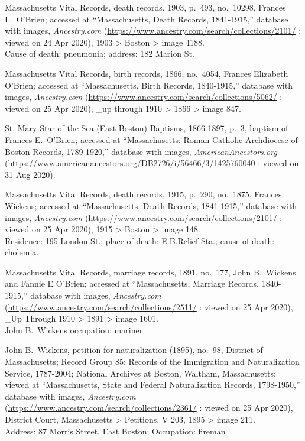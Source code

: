 \begin{thebibliography}{999}
Massachusetts Vital Records, death records, 1903, p.\ 493, no.\ 10298, Frances L.\ O'Brien; accessed at ``Massachusetts, Death Records, 1841-1915,'' database with images, \textit{Ancestry.com} (\url{https://www.ancestry.com/search/collections/2101/} : viewed on 24 Apr 2020), 1903 > Boston > image 4188.\\
Cause of death: pneumonia; address: 182 Marion St.


Massachusetts Vital Records, birth records, 1866, no.\ 4054, Frances Elizabeth O'Brien; accessed at ``Massachusetts, Birth Records, 1840-1915,'' database with images, \textit{Ancestry.com} (\url{https://www.ancestry.com/search/collections/5062/} : viewed on 25 Apr 2020), \_up through 1910 > 1866 > image 847.

St. Mary Star of the Sea (East Boston) Baptisms, 1866-1897, p.\ 3, baptism of Frances E.\ O'Brien; accessed at ``Massachusetts: Roman Catholic Archdiocese of Boston Records, 1789-1920,'' database with images, \textit{AmericanAncestors.org} (\url{https://www.americanancestors.org/DB2726/i/56466/3/1425760040} : viewed on 31 Aug 2020).

Massachusetts Vital Records, death records, 1915, p.\ 290, no.\ 1875, Frances Wickens; accessed at ``Massachusetts, Death Records, 1841-1915,'' database with images, \textit{Ancestry.com} (\url{https://www.ancestry.com/search/collections/2101/} : viewed on 25 Apr 2020), 1915 > Boston > image 148.\\
Residence: 195 London St.; place of death: E.B.Relief Sta.; cause of death: cholemia.

Massachusetts Vital Records, marriage records, 1891, no.\ 177, John B.\ Wickens and Fannie E O'Brien; accessed at ``Massachusetts, Marriage Records, 1840-1915,'' database with images, \textit{Ancestry.com} (\url{https://www.ancestry.com/search/collections/2511/} : viewed on 25 Apr 2020), \_Up Through 1910 > 1891 > image 1601.\\
John B.\ Wickens occupation: mariner

John B.\ Wickens, petition for naturalization (1895), no.\ 98, District of Massachusetts; Record Group 85: Records of the Immigration and Naturalization Service, 1787-2004; National Archives at Boston, Waltham, Massachusetts; viewed at ``Massachusetts, State and Federal Naturalization Records, 1798-1950,'' database with images, \textit{Ancestry.com} (\url{https://www.ancestry.com/search/collections/2361/} : viewed on 25 Apr 2020), District Court, Massachusetts > Petitions, V 203, 1895 > image 211.\\
Address: 87 Morris Street, East Boston; Occupation: fireman


\end{thebibliography}
